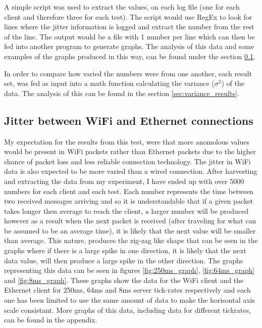 A simple script was used to extract the values, on each log file (one for each client and therefore three for each test). The script would use RegEx to look for lines where the jitter information is logged and extract the number from the rest of the line. The output would be a file with 1 number per line which can then be fed into another program to generate graphs. The analysis of this data and some examples of the graphs produced in this way, can be found under the section \ref{sec:jitter_results}.

In order to compare how varied the numbers were from one another, each result set, was fed as input into a math function calculating the variance ($\sigma^2$) of the data. The analysis of this can be found in the section \ref{sec:variance_results}.

\newpage
\subsection{Jitter between WiFi and Ethernet connections} \label{sec:jitter_results}
My expectation for the results from this test, were that more anomolous values would be present in WiFi packets rather than Ethernet packets due to the higher chance of packet loss and less reliable connection technology. The jitter in WiFi data is also expected to be more varied than a wired connection.
After harvesting and extracting the data from my experiment, I have ended up with over 5000 numbers for each client and each test. Each number represents the time between two received messages arriving and so it is understandable that if a given packet takes longer then average to reach the client, a larger number will be produced however as a result when the next packet is received (after traveling for what can be assumed to be an average time), it is likely that the next value will be smaller than average. This nature, produces the zig-zag like shape that can be seen in the graphs where if there is a large spike in one direction, it is likely that the next data value, will then produce a large spike in the other direction. The graphs representing this data can be seen in figures \ref{fig:250ms_graph}, \ref{fig:64ms_graph} and \ref{fig:8ms_graph}. These graphs show the data for the WiFi client and the Ethernet client for 250ms, 64ms and 8ms server tick-rates respectively and each one has been limited to use the same amount of data to make the horisontal axis scale consistant. More graphs of this data, including data for different tickrates, can be found in the appendix.

